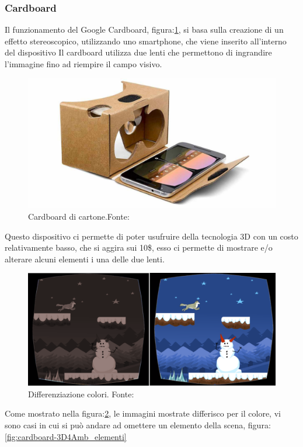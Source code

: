 \documentclass[
a4paper,
cleardoublepage=empty,
headings=twolinechapter,
numbers=autoenddot,
]{scrbook}
\begin{document}
	\subsubsection{Cardboard}\label{chap:cardboard}
    Il funzionamento del Google Cardboard, figura:\ref{fig:cardboard}, si basa sulla creazione di un effetto stereoscopico\cite{Stereoscopio}, utilizzando uno smartphone, che viene inserito all'interno del dispositivo
	Il cardboard utilizza due lenti che permettono di ingrandire l'immagine fino ad riempire il campo visivo\cite{Funzionamento_cardboard}.
	\begin{figure}[H]
		\centering
		\includegraphics[width=0.8\linewidth]{image/cardboard}
		\caption{Cardboard di cartone.Fonte:\cite{Cardboard_image}}
		\label{fig:cardboard}
	\end{figure}
	Questo dispositivo ci permette di poter usufruire della tecnologia 3D con un costo relativamente basso, che si aggira sui 10\$, esso ci permette di mostrare e/o alterare alcuni elementi i una delle due lenti.
	\begin{figure}[H]
		\centering
		\includegraphics[width=0.8\linewidth]{image/3D4Amb_1}
		\caption{Differenziazione colori.
			Fonte:\cite{3d4amb}}
		\label{fig:cardboard-3D4Amb_colori}
	\end{figure}
    Come mostrato nella figura:\ref{fig:cardboard-3D4Amb_colori}, le immagini mostrate differisco per il colore, vi sono casi in cui si può andare ad omettere un elemento della scena, figura:\ref{fig:cardboard-3D4Amb_elementi}
\end{document}
